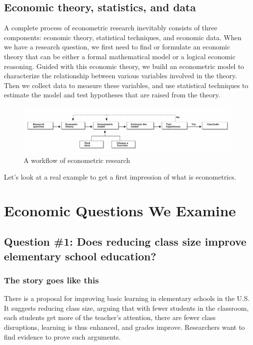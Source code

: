 \documentclass[a4paper,11pt]{article}
\begin{document}
\subsection*{Economic theory, statistics, and data}
\label{sec:org499311f}

A complete process of econometric research inevitably consists of three
components: economic theory, statistical techniques, and economic
data. When we have a research question, we first need to find or
formulate an economic theory that can be either a formal mathematical
model or a logical economic reasoning. Guided with this economic
theory, we build an econometric model to characterize the relationship
between various variables involved in the theory. Then we collect data
to measure these variables, and use statistical techniques to estimate
the model and test hypotheses that are raised from the theory.

\begin{figure}[htbp]
\centering
\includegraphics[width=1.0\textwidth]{figure/econometric_workflow.png}
\caption{\label{fig:orged9c2a8}
A workflow of econometric research}
\end{figure}

Let's look at a real example to get a first impression of what is
econometrics.


\section{Economic Questions We Examine}
\label{sec:org5afe1f9}

\subsection*{Question \#1: Does reducing class size improve elementary school education?}
\label{sec:org22cbe87}

\subsubsection*{The story goes like this}
\label{sec:org9870b40}

There is a proposal for improving basic learning in elementary schools
in the U.S. It suggests reducing class size, arguing that with fewer
students in the classroom, each students get more of the teacher's
attention, there are fewer class disruptions, learning is thus
enhanced, and grades improve. Researchers want to find evidence to
prove such arguments.
\end{document}
